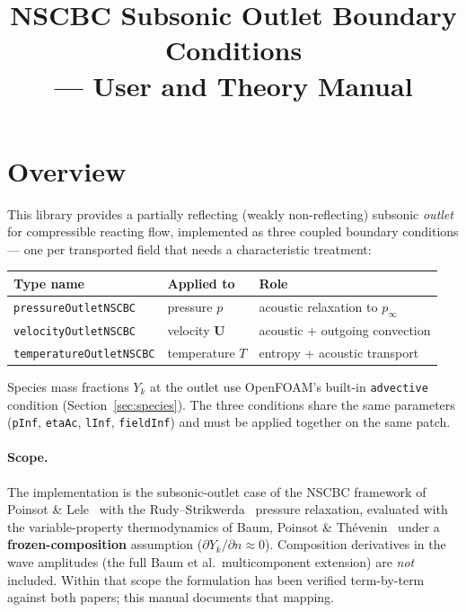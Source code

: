 \documentclass[11pt,a4paper]{article}
\title{\textbf{NSCBC Subsonic Outlet Boundary Conditions}\\[2pt]
       \large \foamver{} --- User and Theory Manual}
\author{}
\date{}
\newcommand{\code}[1]{\texttt{#1}}
\begin{document}
\maketitle
\thispagestyle{empty}
\tableofcontents
\newpage

\section{Overview}
This library provides a partially reflecting (weakly non-reflecting) subsonic
\emph{outlet} for compressible reacting flow, implemented as three coupled
boundary conditions --- one per transported field that needs a characteristic
treatment:

\begin{center}
\begin{tabular}{lll}
\toprule
Type name & Applied to & Role \\
\midrule
\code{pressureOutletNSCBC}    & pressure $p$            & acoustic relaxation to $p_\infty$\\
\code{velocityOutletNSCBC}    & velocity $\mathbf{U}$   & acoustic + outgoing convection\\
\code{temperatureOutletNSCBC} & temperature $T$         & entropy + acoustic transport\\
\bottomrule
\end{tabular}
\end{center}

Species mass fractions $Y_k$ at the outlet use OpenFOAM's built-in
\code{advective} condition (Section~\ref{sec:species}). The three conditions
share the same parameters (\code{pInf}, \code{etaAc}, \code{lInf},
\code{fieldInf}) and must be applied together on the same patch.

\paragraph{Scope.} The implementation is the subsonic-outlet case of the NSCBC
framework of Poinsot \& Lele~\cite{PL92} with the Rudy--Strikwerda~\cite{RS80}
pressure relaxation, evaluated with the variable-property thermodynamics of
Baum, Poinsot \& Th\'{e}venin~\cite{BPT94} under a \textbf{frozen-composition}
assumption ($\partial Y_k/\partial n\approx0$). Composition derivatives in the
wave amplitudes (the full Baum et al.\ multicomponent extension) are \emph{not}
included. Within that scope the formulation has been verified term-by-term
against both papers; this manual documents that mapping.
\end{document}
